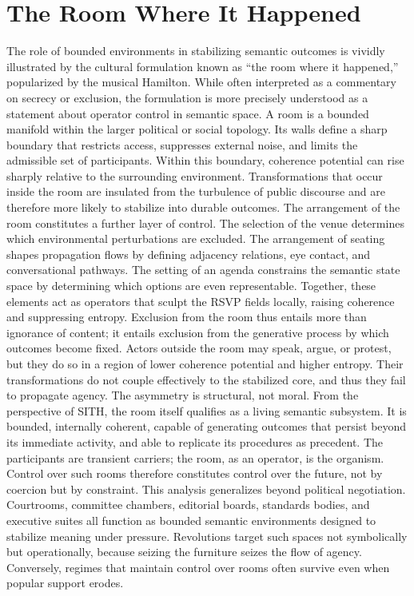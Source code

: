 \documentclass[11pt,oneside]{article}
\begin{document}
\section{The Room Where It Happened}

The role of bounded environments in stabilizing semantic outcomes is vividly illustrated by the cultural formulation known as “the room where it happened,” popularized by the musical Hamilton. While often interpreted as a commentary on secrecy or exclusion, the formulation is more precisely understood as a statement about operator control in semantic space.
A room is a bounded manifold within the larger political or social topology. Its walls define a sharp boundary that restricts access, suppresses external noise, and limits the admissible set of participants. Within this boundary, coherence potential can rise sharply relative to the surrounding environment. Transformations that occur inside the room are insulated from the turbulence of public discourse and are therefore more likely to stabilize into durable outcomes.
The arrangement of the room constitutes a further layer of control. The selection of the venue determines which environmental perturbations are excluded. The arrangement of seating shapes propagation flows by defining adjacency relations, eye contact, and conversational pathways. The setting of an agenda constrains the semantic state space by determining which options are even representable. Together, these elements act as operators that sculpt the RSVP fields locally, raising coherence and suppressing entropy.
Exclusion from the room thus entails more than ignorance of content; it entails exclusion from the generative process by which outcomes become fixed. Actors outside the room may speak, argue, or protest, but they do so in a region of lower coherence potential and higher entropy. Their transformations do not couple effectively to the stabilized core, and thus they fail to propagate agency. The asymmetry is structural, not moral.
From the perspective of SITH, the room itself qualifies as a living semantic subsystem. It is bounded, internally coherent, capable of generating outcomes that persist beyond its immediate activity, and able to replicate its procedures as precedent. The participants are transient carriers; the room, as an operator, is the organism. Control over such rooms therefore constitutes control over the future, not by coercion but by constraint.
This analysis generalizes beyond political negotiation. Courtrooms, committee chambers, editorial boards, standards bodies, and executive suites all function as bounded semantic environments designed to stabilize meaning under pressure. Revolutions target such spaces not symbolically but operationally, because seizing the furniture seizes the flow of agency. Conversely, regimes that maintain control over rooms often survive even when popular support erodes.
\end{document}
